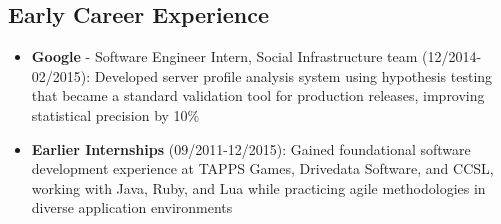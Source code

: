 
\subsection{Early Career Experience}
\begin{itemize}
    \item \small{\textbf{Google} - \BackEnd{} Software Engineer Intern, Social Infrastructure team} \footnotesize{(12/2014-02/2015): Developed server profile analysis system using hypothesis testing that became a standard validation tool for production releases, improving statistical precision by 10\%}

    \item \small{\textbf{Earlier Internships}} \footnotesize{(09/2011-12/2015): Gained foundational software development experience at TAPPS Games, Drivedata Software, and CCSL, working with Java, Ruby, and Lua while practicing agile methodologies in diverse application environments}
\end{itemize}